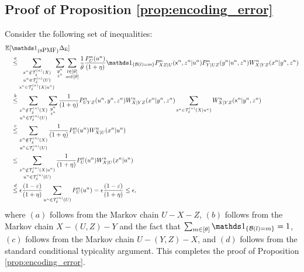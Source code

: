   \subsection{Proof of Proposition \ref{prop:encoding_error}}\label{app:proof:prop:encoding_error}
 Consider the following set of inequalities:
\begin{align*}
    \EE[&\Ipmf \ee] \\
    &\overset{a}{\leq} \sum_{\substack{\xn \notin \Tx \\ \un \in \Tu \\ \sfxn \in \Txcond}}\sum_{\substack{\yn \\ \zn}} \sum_{\substack{ l \in [\btheta]\\m\in [\theta] }} 
    \frac{1}{\btheta} \frac{P^n_U(\un)}{(1+\eta)} 
    \I_{\set{\calB(l) = m}} 
    P_{XZ|U}^n(\sfxn,\zn|\un)P^n_{Y|UZ}(\yn|\un,\zn)W^n_{X|YZ}(\xn|\yn,\zn) \\
    &\overset{b}{\leq} \sum_{\substack{\xn \notin \Tx \\ \un \in \Tu }}\sum_{\substack{\yn\\\zn}} 
    \frac{1}{(1+\eta)} 
    P_{UYZ}^n(\un,\yn,\zn)W^n_{X|YZ}(\xn|\yn,\zn) \sum_{\sfxn \in \Txcond}W^n_{X|YZ}(\sfxn|\yn,\zn) \\
    &\overset{c}{\leq} \sum_{\substack{\xn \notin \Tx \\ \un \in \Tu }} 
    \frac{1}{(1+\eta)} 
    P_{U}^n(\un)W^n_{X|U}(\xn|\un)\\
    &\overset{}{\leq} \sum_{\substack{\xn \notin \Txcond \\ \un \in \Tu }} 
    \frac{1}{(1+\eta)} 
    P_{U}^n(\un)W^n_{X|U}(\xn|\un)\\
    &\overset{d}{\leq} 
    \epsilon\frac{(1-\varepsilon)}{(1+\eta)} 
    \sum_{\un\in \Tu}P_{U}^n(\un) =    \epsilon\frac{(1-\varepsilon)}{(1+\eta)} \leq \epsilon,
\end{align*}
where $(a)$ follows from the Markov chain $U-X-Z$, $(b)$ follows from the Markov chain $X - (U,Z) - Y$ and the fact that $\sum_{m\in [\theta]} \I_{\set{\calB(l) = m}} =1$, $(c)$ follows from the Markov chain $U- (Y,Z) - X$, and $(d)$ follows from the standard conditional typicality argument. This completes the proof of Proposition \ref{prop:encoding_error}. 

